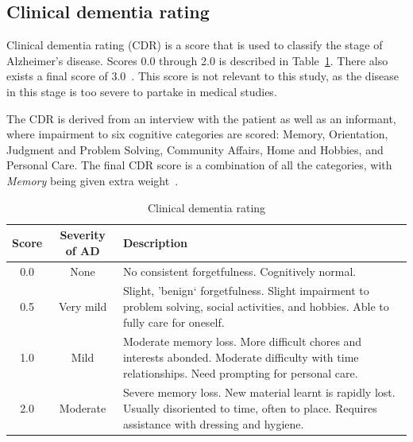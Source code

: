 \documentclass{kththesis}
\renewcommand{\arraystretch}{1.2}
\begin{document}
\subsection{Clinical dementia rating}
Clinical dementia rating (CDR) is a score that is used to classify the stage of Alzheimer’s disease. Scores 0.0 through 2.0 is described in Table~\ref{tab:cdr_definition}. There also exists a final score of 3.0~\cite{cdr}. This score is not relevant to this study, as the disease in this stage is too severe to partake in medical studies.

The CDR is derived from an interview with the patient as well as an informant, where impairment to six cognitive categories are scored: Memory, Orientation, Judgment and Problem Solving, Community Affairs, Home and Hobbies, and Personal Care. The final CDR score is a combination of all the categories, with \textit{Memory} being given extra weight~\cite{cdr}.

\begin{table}[h]
  \renewcommand{\arraystretch}{1.2}
  \begin{center}
    \caption{Clinical dementia rating}
    \label{tab:cdr_definition}
    \begin{tabularx}{\textwidth}{c|cX}
      \textbf{Score} & \textbf{Severity of AD} & \textbf{Description} \\
      \toprule
      0.0 & None & No consistent forgetfulness. Cognitively normal. \\
      0.5 & Very mild & Slight, 'benign` forgetfulness. Slight impairment to problem solving, social activities, and hobbies. Able to fully care for oneself. \\
      1.0 & Mild & Moderate memory loss. More difficult chores and interests abonded. Moderate difficulty with time relationships. Need prompting for personal care. \\
      2.0 & Moderate & Severe memory loss. New material learnt is rapidly lost. Usually disoriented to time, often to place. Requires assistance with dressing and hygiene. \\
    \end{tabularx}
  \end{center}
\end{table}
\end{document}
